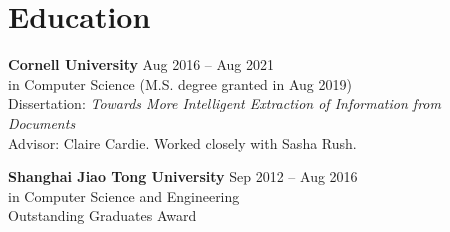 \vspace{-1mm}
\section{Education}
\noindent \textbf{Cornell University} \hfill Aug 2016 -- Aug 2021\\
 in Computer Science ({M.S.} degree granted in Aug 2019) \\
\indent Dissertation: \emph{Towards More Intelligent Extraction of Information from Documents} \\
\indent Advisor: Claire Cardie. Worked closely with Sasha Rush.

\noindent \textbf{Shanghai Jiao Tong University} \hfill Sep 2012 -- Aug 2016 \\
 in Computer Science and Engineering \\
\indent Outstanding Graduates Award \\
